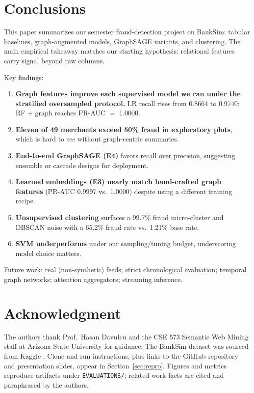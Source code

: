 \documentclass[conference]{IEEEtran}
\begin{document}
\section{Conclusions}

This paper summarizes our semester fraud-detection project on BankSim: tabular baselines, graph-augmented models, GraphSAGE variants, and clustering. The main empirical takeaway matches our starting hypothesis: relational features carry signal beyond raw columns.

Key findings:
\begin{enumerate}
    \item \textbf{Graph features improve each supervised model we ran under the stratified oversampled protocol.} LR recall rises from 0.8664 to 0.9740; RF + graph reaches PR-AUC $=$ 1.0000.
    \item \textbf{Eleven of 49 merchants exceed 50\% fraud in exploratory plots}, which is hard to see without graph-centric summaries.
    \item \textbf{End-to-end GraphSAGE (E4)} favors recall over precision, suggesting ensemble or cascade designs for deployment.
    \item \textbf{Learned embeddings (E3) nearly match hand-crafted graph features} (PR-AUC 0.9997 vs.\ 1.0000) despite using a different training recipe.
    \item \textbf{Unsupervised clustering} surfaces a 99.7\% fraud micro-cluster and DBSCAN noise with a 65.2\% fraud rate vs.\ 1.21\% base rate.
    \item \textbf{SVM underperforms} under our sampling/tuning budget, underscoring model choice matters.
\end{enumerate}

Future work: real (non-synthetic) feeds; strict chronological evaluation; temporal graph networks; attention aggregators; streaming inference.

\section*{Acknowledgment}
The authors thank Prof.\ Hasan Davulcu and the CSE 573 Semantic Web Mining staff at Arizona State University for guidance. The BankSim dataset was sourced from Kaggle \cite{b1}. Clone and run instructions, plus links to the GitHub repository and presentation slides, appear in Section~\ref{sec:repro}. Figures and metrics reproduce artifacts under \texttt{EVALUATIONS/}; related-work facts are cited and paraphrased by the authors.
\end{document}
